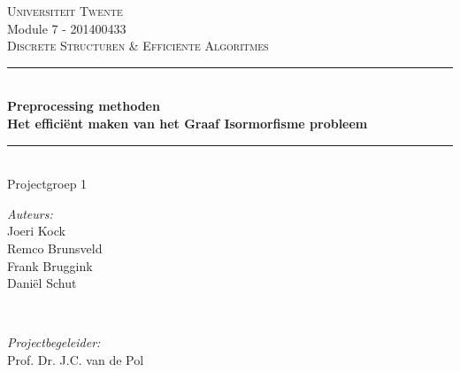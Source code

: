 \documentclass{article}
\begin{document}

\begin{titlepage}
		\newcommand{\HRule}{\rule{\linewidth}{0.5mm}}
		\center 						%
		 

		\textsc{\large Universiteit Twente}\\[1.5cm]
		Module 7 - 201400433\\
		\vspace{5mm}
		\textsc{\Large Discrete Structuren \& Effici\"ente Algoritmes}\\[0.5cm]
		\vspace{15mm}


		\HRule \\[0.4cm]
		{ \huge \bfseries Preprocessing methoden}\\[0.4cm]
		{ \large \bfseries Het effici\"ent maken van het Graaf Isormorfisme probleem}\\[0.4cm]
		\HRule \\[1.5cm]
		 

		Projectgroep 1\\
		\vspace{10mm}
		\begin{minipage}{0.4\textwidth}
		\begin{flushleft} \large
		\emph{Auteurs:}\\
		Joeri Kock\\
		Remco Brunsveld\\
		Frank Bruggink\\
		Dani\"el Schut
		\end{flushleft}
		\end{minipage}
		~
		\begin{minipage}{0.4\textwidth}
		\begin{flushright} \large
		\emph{Projectbegeleider:} \\
		Prof. Dr. J.C. van de Pol
		\end{flushright}
		\end{minipage}\\[4cm]


\end{titlepage}
\end{document}

